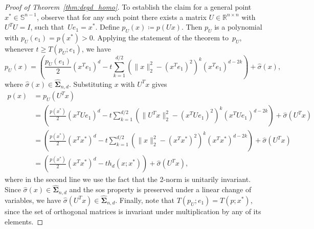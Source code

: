 \documentclass[10pt,a4paper]{amsart}
\newcommand{\HSOS}{\widehat{\mathbf{\Sigma}}}
\newcommand{\defeq}{\coloneq}
\newcommand{\mbS}{\mathbb{S}}
\newcommand{\reals}{\mathbb{R}}
\begin{document}
\begin{proof}[Proof of Theorem~\ref{thm:degd_homo}]
To establish the claim for a general point $x^*\in \mbS^{n-1}$, observe that for any such point there exists a matrix $U\in\reals^{n\times n}$ with $U^TU=I$, such that~$Ue_1=x^*$. Define $p_U(x)\defeq p(Ux)$. Then $p_U$ is a polynomial with $p_U(e_1)=p(x^*)>0$. Applying the statement of the theorem to~$p_U$, whenever $t\ge T(p_U;e_1)$, we have
\[
p_U(x)=\left(\frac{p_U(e_1)}{2}(x^Te_1)^d-t\sum\limits_{k=1}^{d/2}(\|x\|_2^2-(x^Te_1)^2)^{k}(x^Te_1)^{d-2k}\right)+\hat{\sigma}(x),\]
where $\hat{\sigma}(x)\in\HSOS_{n,d}$.
Substituting $x$ with $U^Tx$ gives
\[\begin{aligned}
p(x)&=p_U(U^Tx)\\
&=\left(\frac{p(x^*)}{2}(x^TUe_1)^d-t\sum\limits_{k=1}^{d/2}(\|U^Tx\|_2^2-(x^TUe_1)^2)^{k}(x^TU  e_1)^{d-2k}\right)+\hat{\sigma}(U^Tx)\\
&=\left(\frac{p(x^*)}{2}(x^Tx^*)^d-t\sum\limits_{k=1}^{d/2}(\|x\|_2^2-(x^Tx^*)^2)^{k}(x^Tx^*)^{d-2k}\right)+\hat{\sigma}(U^Tx)\\
&=\left(\frac{p(x^*)}{2}(x^Tx^*)^d-th_d(x;x^*)\right)+\hat{\sigma}(U^Tx),
\end{aligned}
\]
where in the second line we use the fact that the 2-norm is unitarily invariant. 
Since ${\hat{\sigma}(x)\in\HSOS_{n,d}}$ and the sos property is preserved under a linear change of variables, we have ${\hat{\sigma}(U^Tx)\in\HSOS_{n,d}}$. Finally, note that $T(p_U;e_1)=T(p;x^*)$, since the set of orthogonal matrices is invariant under multiplication by any of its elements.
\end{proof}
\end{document}
